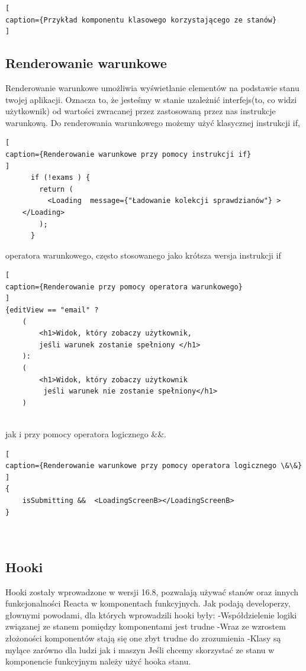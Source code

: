\documentclass[oneside,polski,logo,indent]{amuthesis}
\begin{document}
\begin{enumerate}
\begin{enumerate}
{\begin{lstlisting}[
caption={Przykład komponentu klasowego korzystającego ze stanów}
]
\end{lstlisting}

}


\subsection{Renderowanie warunkowe}

Renderowanie warunkowe umożliwia wyświetlanie elementów na podstawie stanu twojej aplikacji. Oznacza to, że jesteśmy w stanie uzależnić interfejs(to, co widzi użytkownik) od wartości zwracanej przez zastosowaną przez nas instrukcje warunkową.
Do renderowania warunkowego możemy użyć klasycznej instrukcji if,
\begin{lstlisting}[
caption={Renderowanie warunkowe przy pomocy instrukcji if}
]
      if (!exams ) {
        return (
          <Loading  message={"Ładowanie kolekcji sprawdzianów"} >
	</Loading>
        );
      }

\end{lstlisting}

operatora warunkowego, często stosowanego jako krótsza wersja instrukcji if

\begin{lstlisting}[
caption={Renderowanie przy pomocy operatora warunkowego}
]
{editView == "email" ?
	(
		<h1>Widok, który zobaczy użytkownik,
		jeśli warunek zostanie spełniony </h1>
	):
	(
		<h1>Widok, który zobaczy użytkownik
		 jeśli warunek nie zostanie spełniony</h1>
	)


\end{lstlisting}



\pagebreak
jak i przy pomocy operatora logicznego \&\&.

\begin{lstlisting}[
caption={Renderowanie warunkowe przy pomocy operatora logicznego \&\&}
]
{
	isSubmitting &&  <LoadingScreenB></LoadingScreenB>
}  



\end{lstlisting}




\subsection{Hooki}
Hooki zostały wprowadzone w wersji 16.8, pozwalają używać stanów oraz innych funkcjonalności Reacta w komponentach funkcyjnych.
\newline
Jak podają developerzy, głownymi powodami, dla których wprowadzili hooki były:
\newline -Współdzielenie logiki związanej ze stanem pomiędzy komponentami jest trudne
\newline -Wraz ze wzrostem złożoności komponentów stają się one zbyt trudne do zrozumienia
\newline -Klasy są mylące zarówno dla ludzi jak i maszyn
\newline
Jeśli chcemy skorzystać ze stanu w komponencie funkcyjnym należy użyć hooka stanu.



\end{enumerate}
\end{enumerate}
\end{document}
